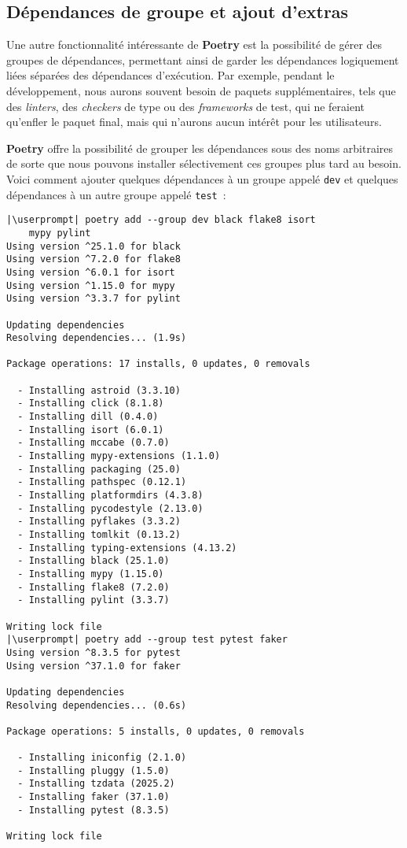 \subsection*{Dépendances de groupe et ajout d’extras}
Une autre fonctionnalité intéressante de \textbf{Poetry} est la possibilité de gérer des groupes de dépendances, permettant ainsi de garder les dépendances logiquement liées séparées des dépendances d’exécution. Par exemple, pendant le développement, nous aurons souvent besoin de paquets supplémentaires, tels que des \textit{linters}, des \textit{checkers} de type ou des \textit{frameworks} de test, qui ne feraient qu’enfler le paquet final, mais qui n'aurons aucun intérêt pour les utilisateurs.

\textbf{Poetry} offre la possibilité de grouper les dépendances sous des noms arbitraires de sorte que nous pouvons installer sélectivement ces groupes plus tard au besoin. Voici comment ajouter quelques dépendances à un groupe appelé \texttt{dev} et quelques dépendances à un autre groupe appelé \texttt{test} :
\begin{lstlisting}[style=bash]
|\userprompt| poetry add --group dev black flake8 isort 
    mypy pylint
Using version ^25.1.0 for black
Using version ^7.2.0 for flake8
Using version ^6.0.1 for isort
Using version ^1.15.0 for mypy
Using version ^3.3.7 for pylint

Updating dependencies
Resolving dependencies... (1.9s)

Package operations: 17 installs, 0 updates, 0 removals

  - Installing astroid (3.3.10)
  - Installing click (8.1.8)
  - Installing dill (0.4.0)
  - Installing isort (6.0.1)
  - Installing mccabe (0.7.0)
  - Installing mypy-extensions (1.1.0)
  - Installing packaging (25.0)
  - Installing pathspec (0.12.1)
  - Installing platformdirs (4.3.8)
  - Installing pycodestyle (2.13.0)
  - Installing pyflakes (3.3.2)
  - Installing tomlkit (0.13.2)
  - Installing typing-extensions (4.13.2)
  - Installing black (25.1.0)
  - Installing mypy (1.15.0)
  - Installing flake8 (7.2.0)
  - Installing pylint (3.3.7)

Writing lock file
|\userprompt| poetry add --group test pytest faker
Using version ^8.3.5 for pytest
Using version ^37.1.0 for faker

Updating dependencies
Resolving dependencies... (0.6s)

Package operations: 5 installs, 0 updates, 0 removals

  - Installing iniconfig (2.1.0)
  - Installing pluggy (1.5.0)
  - Installing tzdata (2025.2)
  - Installing faker (37.1.0)
  - Installing pytest (8.3.5)

Writing lock file
\end{lstlisting}

